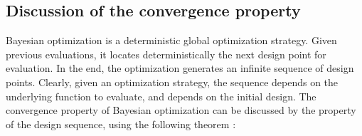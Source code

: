 \documentclass[a4paper,onecolumn]{article}
\theoremstyle{remark}
\newtheorem{theorem}{Theorem}
\begin{document}
\subsection{Discussion of the convergence property}
\noindent Bayesian optimization is a deterministic global optimization strategy.
Given previous evaluations, it locates deterministically the next design point for evaluation. In the
end, the optimization generates an infinite sequence of design points.
Clearly, given an optimization strategy, 
the sequence depends on the underlying function to evaluate, and depends on the initial design.
The convergence property of Bayesian optimization can be discussed by the property of the design
sequence, using the following theorem \cite{Torn and Zilinskas}:\\
\\
\end{document}
